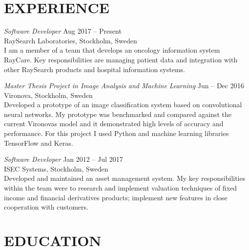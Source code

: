 \documentclass[margin, 10pt]{res} %
\begin{document}
\begin{resume}
\section{EXPERIENCE}


{\sl Software Developer} \hfill Aug 2017 -- Present \\
RaySearch Laboratories, Stockholm, Sweden\\
I am a member of a team that develops an oncology information system RayCare. Key responsibilities are managing patient data and integration with other RaySearch products and hospital information systems.

{\sl Master Thesis Project in Image Analysis and Machine Learning} \hfill Jun -- Dec 2016 \\
Vironova, Stockholm, Sweden \\
Developed a prototype of an image classification system based on convolutional neural networks. My prototype was benchmarked and compared against the current Vironovas model and it demonstrated high levels of accuracy and performance. For this project I used Python and machine learning libraries TensorFlow and Keras.


{\sl Software Developer} \hfill Jan 2012 -- Jul 2017 \\
ISEC Systems, Stockholm, Sweden\\
Developed and maintained an asset management system. My key responsibilities within the team were to research and implement valuation techniques of fixed income and financial derivatives products; implement new features in close cooperation with customers. 


 
\section{EDUCATION}  


\end{resume}
\end{document}
